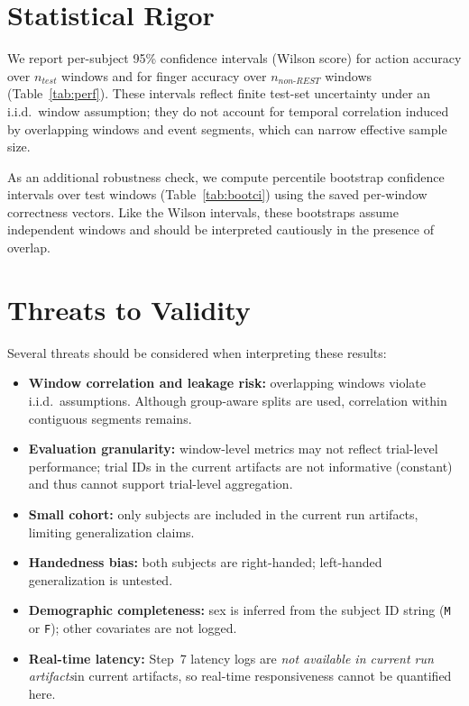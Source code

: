 \documentclass[conference]{IEEEtran}
\newcommand{\NotAvailable}{\textit{not available in current run artifacts}}
\begin{document}
\section{Statistical Rigor}
We report per-subject 95\% confidence intervals (Wilson score) for action accuracy over $n_{test}$ windows and for finger accuracy over $n_{non\text{-}REST}$ windows (Table~\ref{tab:perf}). These intervals reflect finite test-set uncertainty under an i.i.d.\ window assumption; they do not account for temporal correlation induced by overlapping windows and event segments, which can narrow effective sample size.



As an additional robustness check, we compute percentile bootstrap confidence intervals over test windows (Table~\ref{tab:bootci}) using the saved per-window correctness vectors. Like the Wilson intervals, these bootstraps assume independent windows and should be interpreted cautiously in the presence of overlap.

\section{Threats to Validity}
Several threats should be considered when interpreting these results:
\begin{itemize}
\item \textbf{Window correlation and leakage risk:} overlapping windows violate i.i.d.\ assumptions. Although group-aware splits are used, correlation within contiguous segments remains.
\item \textbf{Evaluation granularity:} window-level metrics may not reflect trial-level performance; trial IDs in the current artifacts are not informative (constant) and thus cannot support trial-level aggregation.
\item \textbf{Small cohort:} only \NumSubjects subjects are included in the current run artifacts, limiting generalization claims.
\item \textbf{Handedness bias:} both subjects are right-handed; left-handed generalization is untested.
\item \textbf{Demographic completeness:} sex is inferred from the subject ID string (\texttt{M} or \texttt{F}); other covariates are not logged.
\item \textbf{Real-time latency:} Step~7 latency logs are \NotAvailable in current artifacts, so real-time responsiveness cannot be quantified here.
\end{itemize}
\end{document}
